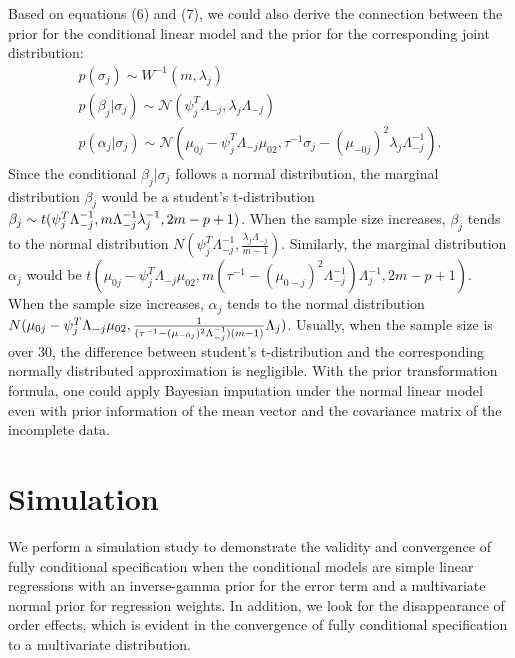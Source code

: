 	Based on equations (6) and (7), we could also derive the connection between the prior for the conditional linear model and the prior for the corresponding joint distribution:
	\begin{equation}
		\begin{array}{l}
			p(\sigma_{j}) \sim W^{-1}(m, \lambda_j)\\
			p(\beta_{j}|\sigma_{j}) \sim \mathcal{N}(\psi_{j}^T\Lambda_{-j}, \lambda_j\Lambda_{-j})\\
			p(\alpha_{j}|\sigma_{j}) \sim \mathcal{N}(\mu_{0j} - \psi_{j}^T\Lambda_{-j}\mu_{02}, \tau^{-1}\sigma_{j} - (\mu_{-0j})^{2}\lambda_j\Lambda_{-j}^{-1}).
		\end{array}
	\end{equation} 
	Since the conditional $\beta_{j} | \sigma_{j}$ follows a normal distribution, the marginal distribution $\beta_{j}$ would be a student's t-distribution $\beta_{j} \sim t(\psi_{j}^T\Lambda_{-j}^{-1}, \\m\Lambda_{-j}^{-1}\lambda_{j}^{-1}, 2m-p+1)$. When the sample size increases, $\beta_{j}$ tends to the normal distribution $N(\psi_{j}^T\Lambda_{-j}^{-1}, \frac{\lambda_{j}\Lambda_{-j}}{m-1})$. Similarly, the marginal distribution $\alpha_{j}$ would be $t(\mu_{0j} - \psi_{j}^T\Lambda_{-j}\mu_{02}, m(\tau^{-1} - (\mu_{0-j})^{2}\Lambda_{-j}^{-1})\Lambda_{j}^{-1}, 2m-p+1)$. When the sample size increases, $\alpha_{j}$ tends to the normal distribution $N(\mu_{0j} - \psi_{j}^T\Lambda_{-j}\mu_{02},\\
	\frac{1}{(\tau^{-1} - (\mu_{-0j})^{2}\Lambda_{-j}^{-1})(m-1)}\Lambda_{j})$. Usually, when the sample size is over 30, the difference between student's t-distribution and the corresponding normally distributed approximation is negligible. With the prior transformation formula, one could apply Bayesian imputation under the normal linear model even with prior information of the mean vector and the covariance matrix of the incomplete data.   
	
	\section{Simulation}
	We perform a simulation study to demonstrate the validity and convergence of fully conditional specification when the conditional models are simple linear regressions with an inverse-gamma prior for the error term and a multivariate normal prior for regression weights. In addition, we look for the disappearance of order effects, which is evident in the convergence of fully conditional specification to a multivariate distribution. 
	
